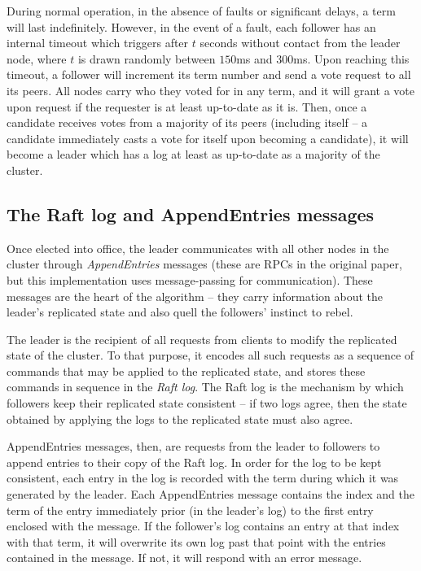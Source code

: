 \documentclass[psamsfonts]{amsart}
\begin{document}
During normal operation, in the absence of faults or significant delays, a term will last indefinitely. However, in the event of a fault, each follower has an internal timeout which triggers after $t$ seconds without contact from the leader node, where $t$ is drawn randomly between $150$ms and $300$ms. Upon reaching this timeout, a follower will increment its term number and send a vote request to all its peers. All nodes carry who they voted for in any term, and it will grant a vote upon request if the requester is at least up-to-date as it is. Then, once a candidate receives votes from a majority of its peers (including itself -- a candidate immediately casts a vote for itself upon becoming a candidate), it will become a leader which has a log at least as up-to-date as a majority of the cluster.
\subsection{The Raft log and AppendEntries messages}
Once elected into office, the leader communicates with all other nodes in the cluster through \emph{AppendEntries} messages (these are RPCs in the original paper, but this implementation uses message-passing for communication). These messages are the heart of the algorithm -- they carry information about the leader's replicated state and also quell the followers' instinct to rebel. 

The leader is the recipient of all requests from clients to modify the replicated state of the cluster. To that purpose, it encodes all such requests as a sequence of commands that may be applied to the replicated state, and stores these commands in sequence in the \emph{Raft log}. The Raft log is the mechanism by which followers keep their replicated state consistent -- if two logs agree, then the state obtained by applying the logs to the replicated state must also agree.

AppendEntries messages, then, are requests from the leader to followers to append entries to their copy of the Raft log. In order for the log to be kept consistent, each entry in the log is recorded with the term during which it was generated by the leader. Each AppendEntries message contains the index and the term of the entry immediately prior (in the leader's log) to the first entry enclosed with the message. If the follower's log contains an entry at that index with that term, it will overwrite its own log past that point with the entries contained in the message. If not, it will respond with an error message.
\end{document}
